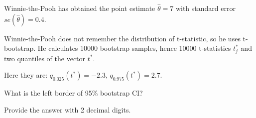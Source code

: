 
\begin{question}
Winnie-the-Pooh has obtained the point estimate \(\hat\theta = 7\)
with standard error \(se(\hat\theta)= 0.4\).

Winnie-the-Pooh does not remember the distribution of t-statistic,
so he uses t-bootstrap.
He calculates 10000 bootstrap samples, hence 10000 t-statistics \(t^*_j\) and
two quantiles of the vector \(t^*\).

Here they are: \(q_{0.025}(t^*) = -2.3\), \(q_{0.975}(t^*)= 2.7\).

What is the left border of 95\% bootstrap CI?

Provide the answer with 2 decimal digits.
\end{question}


